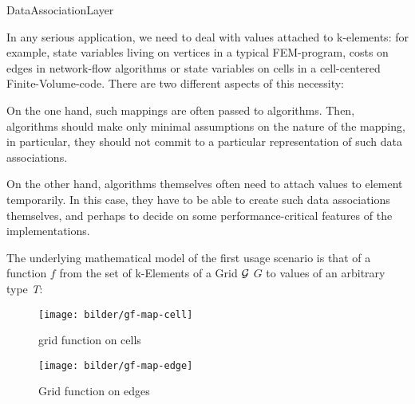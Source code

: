 
\begin{Label}{DataAssociationLayer}
\end{Label}

      In any serious application, we need to deal with values attached to k-elements:
      for example, state variables living on vertices in a typical FEM-program,
      costs on edges in network-flow algorithms or state variables on cells
      in a cell-centered Finite-Volume-code.
      There are two different aspects of this necessity:
      
      On the one hand, such mappings are often passed to algorithms.
      Then, algorithms should make only minimal assumptions on the nature 
      of the mapping, in particular, they should not commit to a particular representation
      of such data associations.

      On the other hand, algorithms themselves often need to attach values to
      element temporarily. In this case, they have to be able to create such data
      associations themselves, and perhaps to decide on some performance-critical
      features of the implementations.
      
      The underlying mathematical model of the first usage scenario 
      is that of a function $f$ from the set 
      of k-Elements of a Grid \T${\cal G}$ \W$G$ to values of an arbitrary type {\em T\/}:

      \begin{center}
        \begin{figure}[h]
          \W{}
          \T\begin{minipage}{6cm}
            \T\texttt{[image: bilder/gf-map-cell]}
            \W{}
            \W{}
            \caption{grid function on cells}
            \W{}
            \T\end{minipage}  \T\hspace{1cm}
          \T\begin{minipage}{6cm}
            \T\texttt{[image: bilder/gf-map-edge]}
            \W{}
            \W{}
            \caption{Grid function on edges}
            \W{}
            \T\end{minipage}
          \W{}
        \end{figure}
      \end{center}



